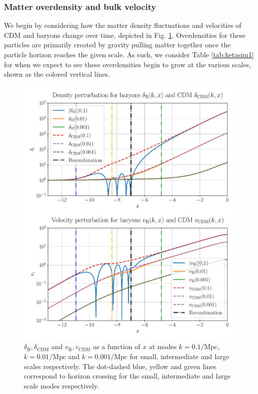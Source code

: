 \documentclass[%
reprint,
 amsmath,amssymb,
 aps,
]{revtex4-2}
\begin{document}
\subsubsection{Matter overdensity and bulk velocity}
We begin by considering how the matter density fluctuations and velocities of CDM and baryons change over time, depicted in Fig. \ref{fig:b_cdm}. Overdensities for these particles are primarily created by gravity pulling matter together once the particle horizon reaches the given scale. As such, we consider Table \ref{tab:ketasim1} for when we expect to see these overdensities begin to grow at the various scales, shown as the colored vertical lines.
\begin{figure}[ht!]
	\includegraphics[width = \linewidth]{Figures/baryon_cdm.pdf}
	\caption{$\delta_\text{B}, \delta_\text{CDM}$ and $v_\text{B},v_\text{CDM}$ as a function of $x$ at modes $k=0.1/\text{Mpc}$, $k=0.01/\text{Mpc}$ and $k=0.001/\text{Mpc}$ for small, intermediate and large scales respectively. The dot-dashed blue, yellow and green lines correspond to horizon crossing for the small, intermediate and large scale modes respectively.}
	\label{fig:b_cdm}
\end{figure}
\end{document}
